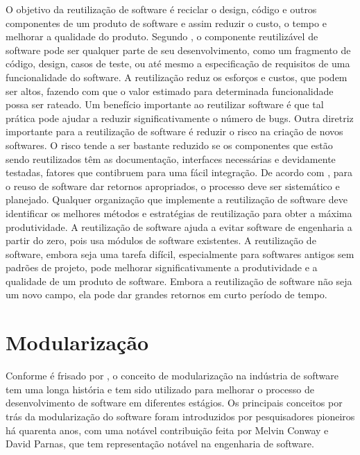 O objetivo da reutilização de software é reciclar o design, código e outros componentes de um produto de software e assim reduzir o custo, o tempo e melhorar a qualidade do produto.
Segundo \citep{6783445}, o componente reutilizável de software pode ser qualquer parte de seu desenvolvimento, como um fragmento de código, design, casos de teste, ou até mesmo a especificação de requisitos de uma funcionalidade do software. 
A reutilização reduz os esforços e custos, que podem ser altos, fazendo com que o valor estimado para determinada funcionalidade possa ser rateado. Um benefício importante ao reutilizar software é que tal prática pode ajudar a reduzir significativamente o número de bugs. 
Outra diretriz importante para a reutilização de software é reduzir o risco na criação de novos softwares. O risco tende a ser bastante reduzido se os componentes que estão sendo reutilizados têm as documentação, interfaces necessárias e devidamente testadas, fatores que contibruem para uma fácil integração.
De acordo com \citep{6783445}, para o reuso de software dar retornos apropriados, o processo deve ser sistemático e planejado. Qualquer organização que implemente a reutilização de software deve identificar os melhores métodos e estratégias de reutilização para obter a máxima produtividade. A reutilização de software ajuda a evitar software de engenharia a partir do zero, pois usa módulos de software existentes. A reutilização de software, embora seja uma tarefa difícil, especialmente para softwares antigos sem padrões de projeto, pode melhorar significativamente a produtividade e a qualidade de um produto de software. Embora a reutilização de software não seja um novo campo, ela pode dar grandes retornos em curto período de tempo.


\section{Modularização}\label{sec:modularizacao}


Conforme é frisado por \citep{7062705}, o conceito de modularização na indústria de software tem uma longa história e tem sido utilizado para melhorar o processo de desenvolvimento de software em diferentes estágios. Os principais conceitos por trás da modularização do software foram introduzidos por pesquisadores pioneiros há quarenta anos, com uma notável contribuição feita por Melvin Conway e David Parnas, que tem representação notável na engenharia de software.


